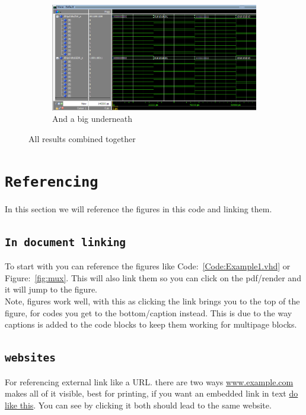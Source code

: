 \documentclass{article}
\let\oldsection\section
\renewcommand{\section}[1]{%
  \oldsection{\texttt{#1}} %
  \setcounter{subsection}{-1} %
  \setcounter{figure}{-1} %
}
\let\oldsubsection\subsection
\renewcommand{\subsection}[1]{%
  \oldsubsection{\texttt{#1}}%
  \setcounter{subsubsection}{-1}%
}
\begin{document}
\begin{figure}[h]
    \begin{subfigure}{1\textwidth} %
        \centering
        \includegraphics[width=1\textwidth]{Figures/Example_sim.png}
        \caption{And a big underneath}
        \label{fig:simUnder}
    \end{subfigure}
    \caption{All results combined together}
    \label{fig:multifig}
\end{figure}


\section{Referencing}
In this section we will reference the figures in this code and linking them.

\subsection{In document linking}
To start with you can reference the figures like Code:~\ref{Code:Example1.vhd} or Figure:~\ref{fig:mux}. This will also link them so you can click on the pdf/render and it will jump to the figure.\\ %
Note, figures work well, with this as clicking the link brings you to the top of the figure, for codes you get to the bottom/caption instead. This is due to the way captions is added to the code blocks to keep them working for multipage blocks.

\subsection{websites}
For referencing external link like a URL. there are two ways \url{www.example.com} makes all of it visible, best for printing, if you want an embedded link in text \href{www.example.com}{do like this}. You can see by clicking it both should lead to the same website.
\end{document}
